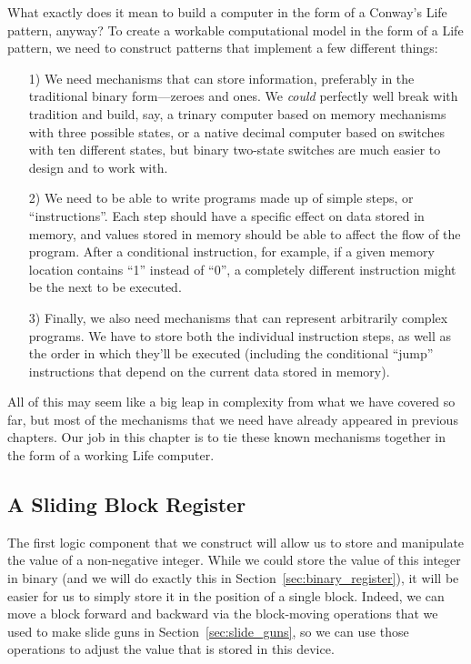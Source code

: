 What exactly does it mean to build a computer in the form of a Conway's Life pattern, anyway? To create a workable computational model in the form of a Life pattern, we need to construct patterns that implement a few different things:\smallskip

\begin{enumerate}
	\item[1)] We need mechanisms that can store information, preferably in the traditional binary form---zeroes and ones. We \emph{could} perfectly well break with tradition and build, say, a trinary computer based on memory mechanisms with three possible states, or a native decimal computer based on switches with ten different states, but binary two-state switches are much easier to design and to work with.\smallskip
	
	\item[2)] We need to be able to write programs made up of simple steps, or ``instructions''. Each step should have a specific effect on data stored in memory, and values stored in memory should be able to affect the flow of the program. After a conditional instruction, for example, if a given memory location contains ``1'' instead of ``0'', a completely different instruction might be the next to be executed.\smallskip
	
	\item[3)] Finally, we also need mechanisms that can represent arbitrarily complex programs. We have to store both the individual instruction steps, as well as the order in which they'll be executed (including the conditional ``jump'' instructions that depend on the current data stored in memory).\smallskip
\end{enumerate}

All of this may seem like a big leap in complexity from what we have covered so far, but most of the mechanisms that we need have already appeared in previous chapters. Our job in this chapter is to tie these known mechanisms together in the form of a working Life computer.


\subsection{A Sliding Block Register}\label{sec:sliding_block_register}

The first logic component that we construct will allow us to store and manipulate the value of a non-negative integer. While we could store the value of this integer in binary (and we will do exactly this in Section~\ref{sec:binary_register}), it will be easier for us to simply store it in the position of a single block. Indeed, we can move a block forward and backward via the block-moving operations that we used to make slide guns in Section~\ref{sec:slide_guns}, so we can use those operations to adjust the value that is stored in this device.

